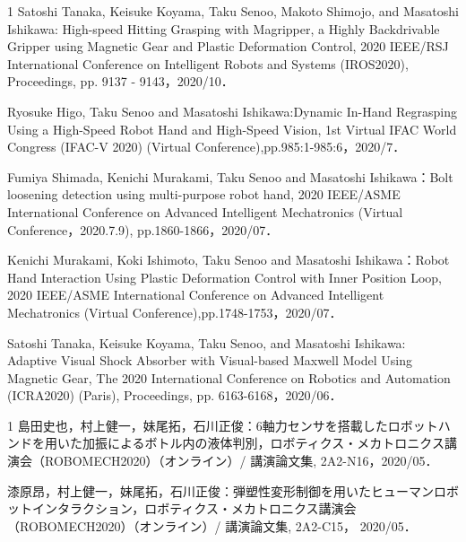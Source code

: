 \begin{査読付}{1}
Satoshi Tanaka, Keisuke Koyama, Taku Senoo, Makoto Shimojo, and Masatoshi Ishikawa: High-speed Hitting Grasping with Magripper, a Highly Backdrivable Gripper using Magnetic Gear and Plastic Deformation Control, 2020 IEEE/RSJ International Conference on Intelligent Robots and Systems (IROS2020), Proceedings, pp. 9137 - 9143，2020/10．

Ryosuke Higo, Taku Senoo and Masatoshi Ishikawa:Dynamic In-Hand Regrasping Using a High-Speed Robot Hand and High-Speed Vision, 1st Virtual IFAC World Congress (IFAC-V 2020) (Virtual Conference),pp.985:1-985:6，2020/7．

Fumiya Shimada, Kenichi Murakami, Taku Senoo and Masatoshi Ishikawa：Bolt loosening detection using multi-purpose robot hand, 2020 IEEE/ASME International Conference on Advanced Intelligent Mechatronics (Virtual Conference，2020.7.9), pp.1860-1866，2020/07．

Kenichi Murakami, Koki Ishimoto, Taku Senoo and Masatoshi Ishikawa：Robot Hand Interaction Using Plastic Deformation Control with Inner Position Loop, 2020 IEEE/ASME International Conference on Advanced Intelligent Mechatronics (Virtual Conference),pp.1748-1753，2020/07．

Satoshi Tanaka, Keisuke Koyama, Taku Senoo, and Masatoshi Ishikawa: Adaptive Visual Shock Absorber with Visual-based Maxwell Model Using Magnetic Gear, The 2020 International Conference on Robotics and Automation (ICRA2020) (Paris), Proceedings, pp. 6163-6168，2020/06．

\end{査読付}

\begin{発表}{1}
島田史也，村上健一，妹尾拓，石川正俊：6軸力センサを搭載したロボットハンドを用いた加振によるボトル内の液体判別，ロボティクス・メカトロニクス講演会（ROBOMECH2020）（オンライン）/ 講演論文集, 2A2-N16，2020/05．

漆原昂，村上健一，妹尾拓，石川正俊：弾塑性変形制御を用いたヒューマンロボットインタラクション，ロボティクス・メカトロニクス講演会（ROBOMECH2020）（オンライン）/ 講演論文集, 2A2-C15， 2020/05．

\end{発表}


